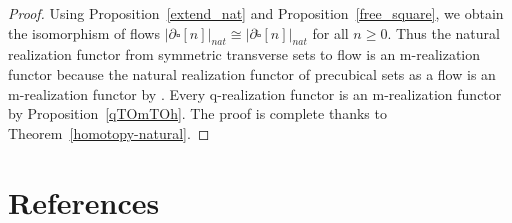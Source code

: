 \documentclass[a4paper,12pt]{amsart}
\newcommand{\de}{\partial}
\newcommand{\bpf}{\begin{proof}}
\newcommand{\epf}{\end{proof}}
\theoremstyle{definition}
\newcommand{\iso}{\cong}
\renewcommand{\geq}{\geqslant}
\begin{document}
\bpf
Using Proposition~\ref{extend_nat} and Proposition~\ref{free_square}, we obtain the isomorphism of flows $|\de\square[n]|_{nat} \iso |\de\widehat{\square}[n]|_{nat}$ for all $n\geq 0$. Thus the natural realization functor from symmetric transverse sets to flow is an m-realization functor because the natural realization functor of precubical sets as a flow is an m-realization functor by \cite[Theorem~5.9]{NaturalRealization}. Every q-realization functor is an m-realization functor by Proposition~\ref{qTOmTOh}. The proof is complete thanks to Theorem~\ref{homotopy-natural}.
\epf


\part*{References}




% 
\renewcommand{\section}[2]{}%
%	
\end{document}
